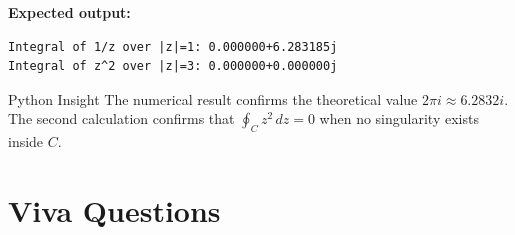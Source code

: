 \documentclass[12pt,a4paper]{article}
\begin{document}
\textbf{Expected output:}
\begin{verbatim}
Integral of 1/z over |z|=1: 0.000000+6.283185j
Integral of z^2 over |z|=3: 0.000000+0.000000j
\end{verbatim}

\begin{learnbox}{Python Insight}
The numerical result confirms the theoretical value $2\pi i \approx 6.2832i$.
The second calculation confirms that $\oint_C z^2\,dz = 0$ when no singularity
exists inside $C$.
\end{learnbox}

\section{Viva Questions}
\end{document}
